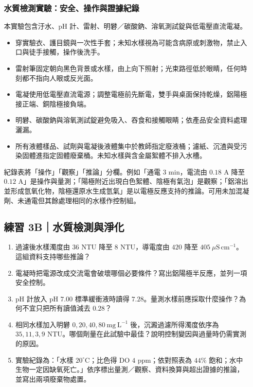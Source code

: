\documentclass[11pt,a4paper]{article}
\providecommand{\tightlist}{%
  \setlength{\itemsep}{0pt}\setlength{\parskip}{0pt}}
\begin{document}
\subsubsection{水質檢測實驗：安全、操作與證據紀錄}\label{ux6c34ux8ceaux6aa2ux6e2cux5be6ux9a57ux5b89ux5168ux64cdux4f5cux8207ux8b49ux64daux7d00ux9304}

本實驗包含汙水、pH 計、雷射、明礬／碳酸鈉、溶氧測試錠與低電壓直流電凝。

\begin{itemize}
\tightlist
\item
  穿實驗衣、護目鏡與一次性手套；未知水樣視為可能含病原或刺激物，禁止入口與徒手接觸，操作後洗手。
\item
  雷射筆固定朝向黑色背景或水樣，由上向下照射；光束路徑低於眼睛，任何時刻都不指向人眼或反光面。
\item
  電凝使用低電壓直流電源；調整電極前先斷電，雙手與桌面保持乾燥，鋁陽極接正端、銅陰極接負端。
\item
  明礬、碳酸鈉與溶氧測試錠避免吸入、吞食和接觸眼睛；依產品安全資料處理灑漏。
\item
  所有液體樣品、試劑與電凝後液體集中於教師指定廢液桶；濾紙、沉渣與受污染固體進指定固體廢棄桶。未知水樣與含金屬絮體不排入水槽。
\end{itemize}

紀錄表將「操作」「觀察」「推論」分欄。例如「通電 \(3\) min，電流由 \(0.18\) A 降至 \(0.12\) A」是操作與量測；「陽極附近出現白色絮體、陰極有氣泡」是觀察；「鋁溶出並形成氫氧化物，陰極還原水生成氫氣」是以電極反應支持的推論。可用未加混凝劑、未通電但其餘處理相同的水樣作控制組。

\subsection{練習 3B｜水質檢測與淨化}\label{ux7df4ux7fd2-3bux6c34ux8ceaux6aa2ux6e2cux8207ux6de8ux5316}

\begin{enumerate}
\def\labelenumi{\arabic{enumi}.}
\tightlist
\item
  過濾後水樣濁度由 \(36\) NTU 降至 \(8\) NTU，導電度由 \(420\) 降至 \(405\ \mu\mathrm{S\,cm^{-1}}\)。這組資料支持哪些推論？
\item
  電凝時把電源改成交流電會破壞哪個必要條件？寫出鋁陽極半反應，並列一項安全控制。
\item
  pH 計放入 pH \(7.00\) 標準緩衝液時讀得 \(7.28\)。量測水樣前應採取什麼操作？為何不宜只把所有讀值減去 \(0.28\)？
\item
  相同水樣加入明礬 \(0,20,40,80\ \mathrm{mg\ L^{-1}}\) 後，沉澱過濾所得濁度依序為 \(35,11,3,9\) NTU。哪個劑量在此試驗中最佳？說明控制變因與過量時仍需實測的原因。
\item
  實驗紀錄為：「水樣 \(20^\circ\mathrm C\)；比色得 DO \(4\) ppm；依對照表為 \(44\%\) 飽和；水中生物一定因缺氧死亡。」依序標出量測／觀察、資料換算與超出證據的推論，並寫出兩項廢棄物處置。
\end{enumerate}
\end{document}
